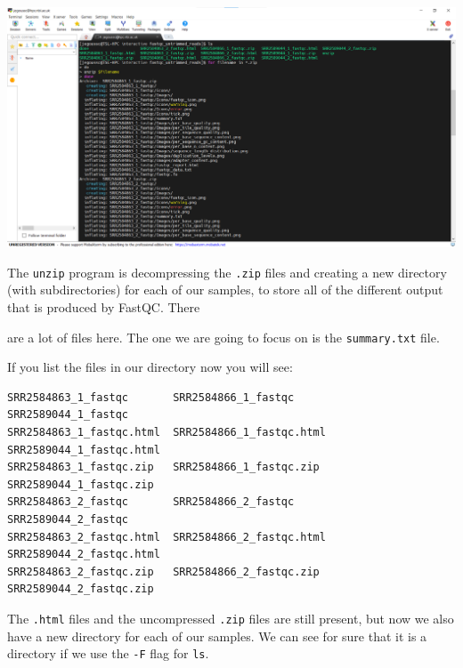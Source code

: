 \documentclass[
  letterpaper,
  DIV=11,
  numbers=noendperiod]{scrreprt}
\newenvironment{Shaded}{\begin{snugshade}}{\end{snugshade}}
\newcommand{\AttributeTok}[1]{\textcolor[rgb]{0.40,0.45,0.13}{#1}}
\newcommand{\ExtensionTok}[1]{\textcolor[rgb]{0.00,0.23,0.31}{#1}}
\newcommand{\NormalTok}[1]{\textcolor[rgb]{0.00,0.23,0.31}{#1}}
\begin{document}
\includegraphics{images/unzip-fastqc-output-file.png}

The \texttt{unzip} program is decompressing the \texttt{.zip} files and
creating a new directory (with subdirectories) for each of our samples,
to store all of the different output that is produced by FastQC. There

are a lot of files here. The one we are going to focus on is the
\texttt{summary.txt} file.

If you list the files in our directory now you will see:

\begin{verbatim}
SRR2584863_1_fastqc       SRR2584866_1_fastqc       SRR2589044_1_fastqc
SRR2584863_1_fastqc.html  SRR2584866_1_fastqc.html  SRR2589044_1_fastqc.html
SRR2584863_1_fastqc.zip   SRR2584866_1_fastqc.zip   SRR2589044_1_fastqc.zip
SRR2584863_2_fastqc       SRR2584866_2_fastqc       SRR2589044_2_fastqc
SRR2584863_2_fastqc.html  SRR2584866_2_fastqc.html  SRR2589044_2_fastqc.html
SRR2584863_2_fastqc.zip   SRR2584866_2_fastqc.zip   SRR2589044_2_fastqc.zip
\end{verbatim}

The \texttt{.html} files and the uncompressed \texttt{.zip} files are
still present, but now we also have a new directory for each of our
samples. We can see for sure that it is a directory if we use the
\texttt{-F} flag for \texttt{ls}.

\begin{Shaded}
\end{Shaded}
\end{document}

